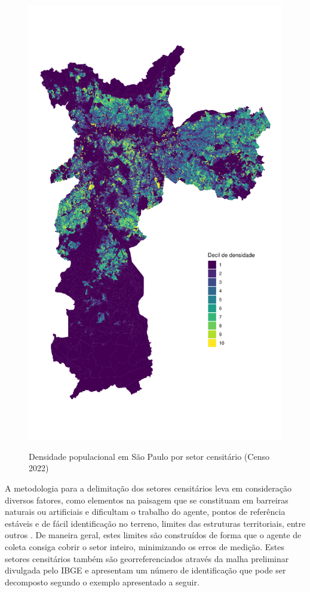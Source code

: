 \begin{figure}[!h]
    \centering
    \caption{Densidade populacional em São Paulo por setor censitário (Censo 2022)}
    \includegraphics[width = .85\linewidth]{imagens/mapa.pdf}
    \label{fig:populacao}
\end{figure}

A metodologia para a delimitação dos setores censitários leva em consideração diversos fatores, como elementos na paisagem que se constituam em barreiras naturais ou artificiais e dificultam o trabalho do agente, pontos de referência estáveis e de fácil identificação no terreno, limites das estruturas territoriais, entre outros \cite{IBGE2024}. De maneira geral, estes limites são construídos de forma que o agente de coleta consiga cobrir o setor inteiro, minimizando os erros de medição. Estes setores censitários também são georreferenciados através da malha preliminar divulgada pelo IBGE e apresentam um número de identificação que pode ser decomposto segundo o exemplo apresentado a seguir.

